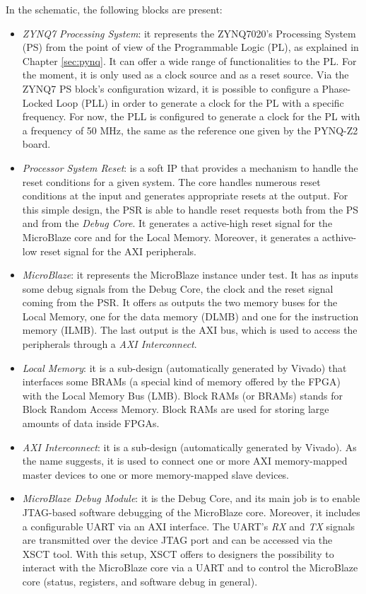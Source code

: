 In the schematic, the following blocks are present:
\begin{itemize}
    \item \textit{ZYNQ7 Processing System}: it represents the ZYNQ7020's Processing System (PS) from the point of view of the Programmable Logic (PL), as explained in Chapter \ref{sec:pynq}. It can offer a wide range of functionalities to the PL. For the moment, it is only used as a clock source and as a reset source. Via the ZYNQ7 PS block's configuration wizard, it is possible to configure a Phase-Locked Loop (PLL) in order to generate a clock for the PL with a specific frequency. For now, the PLL is configured to generate a clock for the PL with a frequency of 50 MHz, the same as the reference one given by the PYNQ-Z2 board.
    \item \textit{Processor System Reset}: is a soft IP that provides a mechanism to handle the reset conditions for a given system. The core handles numerous reset conditions at the input and generates appropriate resets at the output. For this simple design, the PSR is able to handle reset requests both from the PS and from the \textit{Debug Core}. It generates a active-high reset signal for the MicroBlaze core and for the Local Memory. Moreover, it generates a acthive-low reset signal for the AXI peripherals. 
    \item  \textit{MicroBlaze}: it represents the MicroBlaze instance under test. It has as inputs some debug signals from the Debug Core, the clock and the reset signal coming from the PSR. It offers as outputs the two memory buses for the Local Memory, one for the data memory (DLMB) and one for the instruction memory (ILMB). The last output is the AXI bus, which is used to access the peripherals through a \textit{AXI Interconnect}.
    \item \textit{Local Memory}: it is a sub-design (automatically generated by Vivado) that interfaces some BRAMs (a special kind of memory offered by the FPGA) with the Local Memory Bus (LMB). Block RAMs (or BRAMs) stands for Block Random Access Memory. Block RAMs are used for storing large amounts of data inside FPGAs.
    \item \textit{AXI Interconnect}: it is a sub-design (automatically generated by Vivado). As the name suggests, it is used to connect one or more AXI memory-mapped master devices to one or more memory-mapped slave devices.
    \item \textit{MicroBlaze Debug Module}: it is the Debug Core, and its main job is to enable JTAG-based software debugging of the MicroBlaze core. Moreover, it includes a configurable UART via an AXI interface. The UART's \textit{RX} and \textit{TX} signals are transmitted over the device JTAG port and can be accessed via the XSCT tool. With this setup, XSCT offers to designers the possibility to interact with the MicroBlaze core via a UART and to control the MicroBlaze core (status, registers, and software debug in general).
\end{itemize}

